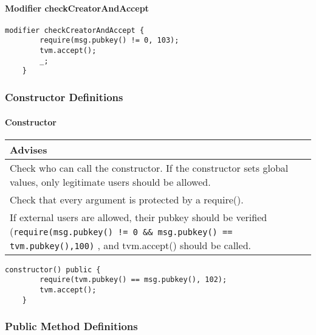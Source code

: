 \paragraph{Modifier checkCreatorAndAccept}


\begin{lstlisting}[firstnumber=58]
	modifier checkCreatorAndAccept {
		require(msg.pubkey() != 0, 103);
		tvm.accept();
		_;
	}
\end{lstlisting}

\subsubsection{Constructor Definitions}


\paragraph{Constructor}


\ifsoldraft
\noindent\begin{tabular}{|p{12cm}|}\hline
\rowcolor{green}Advises
\\\hline
Check who can call the constructor. If the constructor sets global values, only legitimate users should be allowed.
\\\hline
Check that every argument is protected by a require().
\\\hline
If external users are allowed, their pubkey should be verified (\verb+require(msg.pubkey() != 0 && msg.pubkey() == tvm.pubkey(),100)+ , and tvm.accept() should be called.
\\\hline\end{tabular}
\fi
\vspace{2cm}

\begin{lstlisting}[firstnumber=65]
	constructor() public {
		require(tvm.pubkey() == msg.pubkey(), 102);
		tvm.accept();
	}
\end{lstlisting}

\subsubsection{Public Method Definitions}


